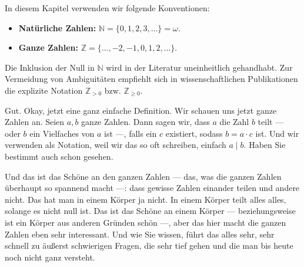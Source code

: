 \begin{math-stroke}
In diesem Kapitel verwenden wir folgende Konventionen:
\begin{itemize}
    \item \textbf{Natürliche Zahlen:} $\mathbb{N} = \{0, 1, 2, 3, \dots\} = \omega$.
    \item \textbf{Ganze Zahlen:} $\mathbb{Z} = \{\dots, -2, -1, 0, 1, 2, \dots\}$.
\end{itemize}

\begin{remark}
Die Inklusion der Null in $\mathbb{N}$ wird in der Literatur uneinheitlich gehandhabt. Zur Vermeidung von Ambiguitäten empfiehlt sich in wissenschaftlichen Publikationen die explizite Notation $\mathbb{Z}_{>0}$ bzw. $\mathbb{Z}_{\ge 0}$.
\end{remark}
\end{math-stroke}

\begin{spoken-clean}[00:04:40 - 00:07:10]
Gut. Okay, jetzt eine ganz einfache Definition. Wir schauen uns jetzt ganze Zahlen an. Seien $a, b$ ganze Zahlen. Dann sagen wir, dass $a$ die Zahl $b$ teilt --- oder $b$ ein Vielfaches von $a$ ist ---, falls ein $c$ existiert, sodass $b = a \cdot c$ ist. Und wir verwenden als Notation, weil wir das so oft schreiben, einfach $a \mid b$. Haben Sie bestimmt auch schon gesehen.

Und das ist das Schöne an den ganzen Zahlen --- das, was die ganzen Zahlen überhaupt so spannend macht ---: dass gewisse Zahlen einander teilen und andere nicht. Das hat man in einem Körper ja nicht. In einem Körper teilt alles alles, solange es nicht null ist. Das ist das Schöne an einem Körper --- beziehungsweise ist ein Körper aus anderen Gründen schön ---, aber das hier macht die ganzen Zahlen eben sehr interessant. Und wie Sie wissen, führt das alles sehr, sehr schnell zu äußerst schwierigen Fragen, die sehr tief gehen und die man bis heute noch nicht ganz versteht.
\end{spoken-clean}

\begin{math-stroke}
\end{math-stroke}

